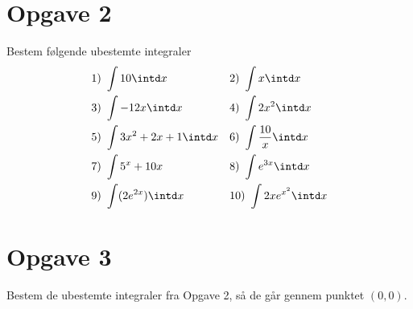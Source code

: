 \section*{Opgave 2}
Bestem følgende ubestemte integraler
\begin{align*}
&1) \  \int10\intd x   &&2) \  \int x \intd x  \\
&3) \  \int -12x \intd x   &&4) \ \int 2x^2 \intd x    \\
&5) \  \int 3x^2+2x+1 \intd x &&6) \ \int \frac{10}{x} \intd x     \\
&7) \  \int 5^x+10x   &&8) \ \int e^{3x} \intd x     \\
&9) \   \int (2e^{2x}) \intd x  &&10) \  \int 2xe^{x^2} \intd x    \\
\end{align*}
\section*{Opgave 3}
Bestem de ubestemte integraler fra Opgave 2, så de går gennem punktet $(0,0)$.